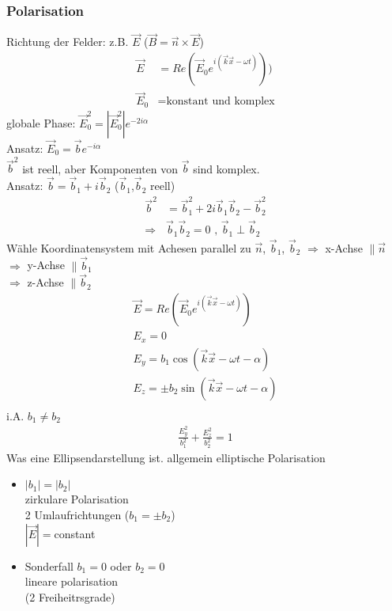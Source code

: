 \documentclass[a4paper]{article}
\begin{document}
\subsubsection{Polarisation}
Richtung der Felder: z.B. $\vec{E}$ ($\vec{B}=\vec{n}\times\vec{E}$)
\begin{align}
\vec{E}&=Re(\vec{E}_0 e^{i(\vec{k}\vec{x}-\omega t)}))\\
\vec{E}_0&=\text{konstant und komplex}
\end{align}
globale Phase: $\vec{E}_0^2=|\vec{E}_0^2|e^{-2i\alpha}$\\
Ansatz: $\vec{E}_0=\vec{b}e^{-i\alpha}$\\
$\vec{b}^2$ ist reell, aber Komponenten von $\vec{b}$ sind komplex.\\
Ansatz: $\vec{b}=\vec{b}_1+i\vec{b}_2$ ($\vec{b}_1$,$\vec{b}_2$ reell)\\
\begin{align}
\vec{b}^2&=\vec{b}_1^2+2i\vec{b}_1\vec{b}_2-\vec{b}_2^2\\
\Rightarrow &\vec{b}_1\vec{b}_2=0 \text{ , }\vec{b}_1\perp\vec{b}_2
\end{align}
Wähle Koordinatensystem mit Achesen parallel zu $\vec{n}$, $\vec{b}_1$,
$\vec{b}_2$
$\Rightarrow$ x-Achse $\parallel \vec{n}$\\
$\Rightarrow$ y-Achse $\parallel \vec{b}_1$\\
$\Rightarrow$ z-Achse $\parallel \vec{b}_2$\\
\begin{align}
\vec{E}=Re(\vec{E}_0 e^{i(\vec{k}\vec{x}-\omega t)})\\
E_x=0\\
E_y=b_1 \cos(\vec{k}\vec{x}-\omega t -\alpha)\\
E_z=\pm b_2 \sin(\vec{k}\vec{x}-\omega t -\alpha)\\
\end{align}
i.A. $b_1\neq b_2$
\begin{align}
\frac{E_y^2}{b_1^2}+\frac{E_z^2}{b_2^2}=1
\end{align}
Was eine Ellipsendarstellung ist.
allgemein elliptische Polarisation
\begin{itemize}
  \item $|b_1|=|b_2|$\\ zirkulare Polarisation \\ 2 Umlaufrichtungen ($b_1=\pm
  b_2$) \\ $|\vec{E}|=$constant
  \item Sonderfall $b_1=0$ oder $b_2=0$ \\ lineare polarisation \\ (2
  Freiheitrsgrade)
\end{itemize}
\end{document}
